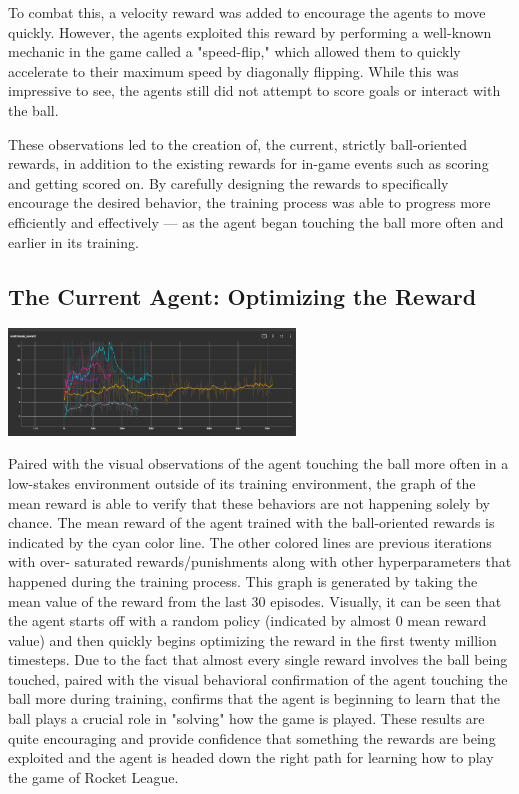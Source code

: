 \documentclass[10pt,twocolumn]{article}
\begin{document}
 To combat this, a velocity reward was added to encourage the 
 agents to move quickly. However, the agents exploited this 
 reward by performing a well-known mechanic in the game 
 called a "speed-flip," which allowed them to quickly 
 accelerate to their maximum speed by diagonally flipping. 
 While this was impressive to see, the agents still did not 
 attempt to score goals or interact with the ball.
 
 These observations led to the creation of, the current, 
 strictly ball-oriented rewards, in addition to the existing 
 rewards for in-game events such as scoring and getting 
 scored on. By carefully designing the rewards to 
 specifically encourage the desired behavior, the training 
 process was able to progress more efficiently and 
 effectively — as the agent began touching the ball more 
 often and earlier in its training.

\subsection{The Current Agent: Optimizing the Reward}

\includegraphics[width=3in,scale=1]{reward_graph.png}

 Paired with the visual observations of the agent touching 
 the ball more often in a low-stakes environment outside of 
 its training environment, the graph of the mean reward is 
 able to verify that these behaviors are not happening solely 
 by chance. The mean reward of the agent trained with the 
 ball-oriented rewards is indicated by the cyan color line. 
 The other colored lines are previous iterations with over- 
 saturated rewards/punishments along with other 
 hyperparameters that happened during the training process. 
 This graph is generated by taking the mean value of the 
 reward from the last 30 episodes. Visually, it can be seen 
 that the agent starts off with a random policy (indicated by 
 almost 0 mean reward value) and then quickly begins 
 optimizing the reward in the first twenty million timesteps. 
 Due to the fact that almost every single reward involves the 
 ball being touched, paired with the visual behavioral 
 confirmation of the agent touching the ball more during 
 training, confirms that the agent is beginning to learn that 
 the ball plays a crucial role in "solving" how the game is 
 played. These results are quite encouraging and provide 
 confidence that something the rewards are being exploited 
 and the agent is headed down the right path for learning how 
 to play the game of Rocket League.
\end{document}
